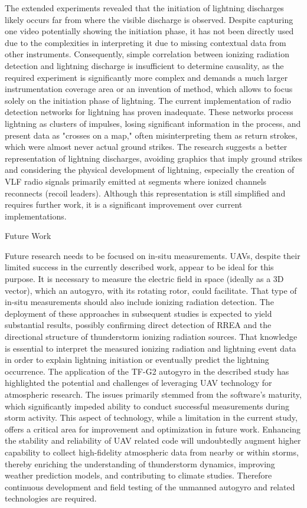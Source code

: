 The extended experiments revealed that the initiation of lightning discharges likely occurs far from where the visible discharge is observed. Despite capturing one video potentially showing the initiation phase, it has not been directly used due to the complexities in interpreting it due to missing contextual data from other instruments. Consequently, simple correlation between ionizing radiation detection and lightning discharge is insufficient to determine causality, as the required experiment is significantly more complex and demands a much larger instrumentation coverage area or an invention of method, which allows to focus solely on the initiation phase of lightning.
The current implementation of radio detection networks for lightning has proven inadequate. These networks process lightning as clusters of impulses, losing significant information in the process, and present data as "crosses on a map," often misinterpreting them as return strokes, which were almost never actual ground strikes. The research suggests a better representation of lightning discharges, avoiding graphics that imply ground strikes and considering the physical development of lightning, especially the creation of VLF radio signals primarily emitted at segments where ionized channels reconnects (recoil leaders). Although this representation is still simplified and requires further work, it is a significant improvement over current implementations.

\sec Future Work

Future research needs to be  focused on in-situ measurements. UAVs, despite their limited success in the currently described work, appear to be ideal for this purpose. It is necessary to measure the electric field in space (ideally as a 3D vector), which an autogyro, with its rotating rotor, could facilitate. That type of in-situ measurements should also include ionizing radiation detection.
The deployment of these approaches in subsequent studies is expected to yield substantial results, possibly confirming direct detection of RREA and the directional structure of thunderstorm ionizing  radiation sources. That knowledge is essential to interpret the measured ionizing radiation and lightning event data in order to explain lightning initiation or eventually predict the lightning occurrence. 
The application of the TF-G2 autogyro in the described study has highlighted the potential and challenges of leveraging UAV technology for atmospheric research. The issues primarily stemmed from the software's maturity, which significantly impeded ability to conduct successful measurements during storm activity. This aspect of technology, while a limitation in the current study, offers a critical area for improvement and optimization in future work. Enhancing the stability and reliability of UAV related code will undoubtedly augment higher capability to collect high-fidelity atmospheric data from nearby or within storms, thereby enriching the understanding of thunderstorm dynamics, improving weather prediction models, and contributing to climate studies. Therefore continuous development and field testing of the unmanned autogyro and related technologies are required.



